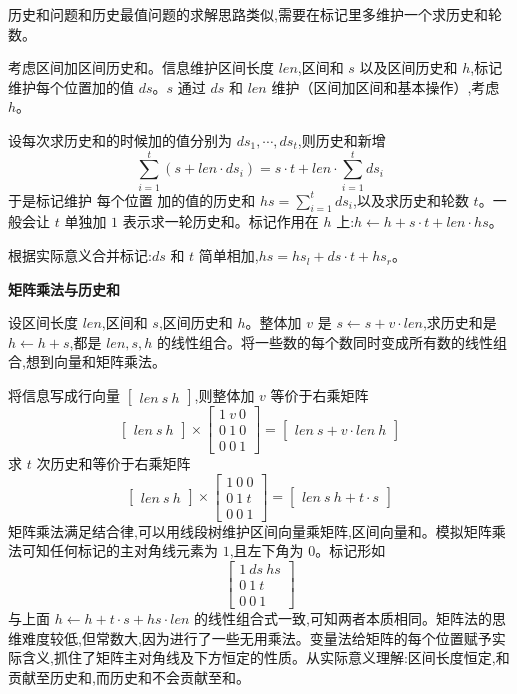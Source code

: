 \documentclass[a4paper]{ctexart}
\begin{document}
历史和问题和历史最值问题的求解思路类似,需要在标记里多维护一个求历史和轮数。

考虑区间加区间历史和。信息维护区间长度 $len$,区间和 $s$ 以及区间历史和 $h$,标记维护每个位置加的值 $ds$。$s$ 通过 $ds$ 和 $len$ 维护（区间加区间和基本操作）,考虑 $h$。

设每次求历史和的时候加的值分别为 $ds_1, \cdots, ds_t$,则历史和新增
$$
\sum_{i = 1} ^ t (s + len\cdot ds_i) = s\cdot t + len \cdot \sum_{i = 1} ^ t ds_i
$$
于是标记维护 每个位置 加的值的历史和 $hs = \sum_{i = 1} ^ t ds_i$,以及求历史和轮数 $t$。一般会让 $t$ 单独加 $1$ 表示求一轮历史和。标记作用在 $h$ 上:$h\gets h + s\cdot t + len \cdot hs$。

根据实际意义合并标记:$ds$ 和 $t$ 简单相加,$hs = hs_l + ds\cdot t + hs_r$。


\textbf{矩阵乘法与历史和}

设区间长度 $len$,区间和 $s$,区间历史和 $h$。整体加 $v$ 是 $s\gets s + v\cdot len$,求历史和是 $h\gets h + s$,都是 $len, s, h$ 的线性组合。将一些数的每个数同时变成所有数的线性组合,想到向量和矩阵乘法。

将信息写成行向量 $\begin{bmatrix} len \ s \ h \end{bmatrix}$,则整体加 $v$ 等价于右乘矩阵
$$
\begin{bmatrix} len \ s \ h \end{bmatrix} \times \begin{bmatrix} 1 \ v \ 0 \\ 0 \ 1 \ 0 \\ 0 \ 0 \ 1 \end{bmatrix} = \begin{bmatrix} len \ s + v\cdot len \ h \end{bmatrix}
$$
求 $t$ 次历史和等价于右乘矩阵
$$
\begin{bmatrix} len \ s \ h \end{bmatrix} \times \begin{bmatrix} 1 \ 0 \ 0 \\ 0 \ 1 \ t \\ 0 \ 0 \ 1 \end{bmatrix} = \begin{bmatrix} len \ s \ h + t\cdot s \end{bmatrix}
$$
矩阵乘法满足结合律,可以用线段树维护区间向量乘矩阵,区间向量和。模拟矩阵乘法可知任何标记的主对角线元素为 $1$,且左下角为 $0$。标记形如
$$
\begin{bmatrix} 1 \ ds \ hs \\ 0 \ 1 \ t \\ 0 \ 0 \ 1 \end{bmatrix}
$$
与上面 $h\gets h + t \cdot s + hs \cdot len$ 的线性组合式一致,可知两者本质相同。矩阵法的思维难度较低,但常数大,因为进行了一些无用乘法。变量法给矩阵的每个位置赋予实际含义,抓住了矩阵主对角线及下方恒定的性质。从实际意义理解:区间长度恒定,和贡献至历史和,而历史和不会贡献至和。
\end{document}
